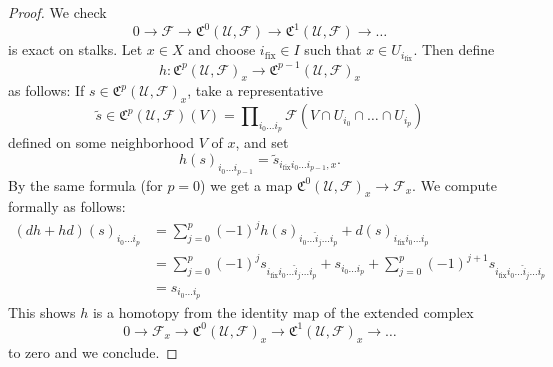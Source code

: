 \begin{proof}
We check
$$
0 \to \mathcal{F} \to \mathfrak{C}^0(\mathcal{U}, \mathcal{F}) \to
\mathfrak{C}^1(\mathcal{U}, \mathcal{F}) \to  \ldots
$$
is exact on stalks. Let $x \in X$ and choose $i_{\text{fix}} \in I$
such that $x \in U_{i_{\text{fix}}}$. Then define 
$$
h : \mathfrak{C}^p(\mathcal{U}, \mathcal{F})_x
\to \mathfrak{C}^{p - 1}(\mathcal{U}, \mathcal{F})_x
$$
as follows: If $s \in \mathfrak{C}^p(\mathcal{U}, \mathcal{F})_x$, take
a representative
$$
\widetilde{s} \in
\mathfrak{C}^p(\mathcal{U}, \mathcal{F})(V) =
\prod\nolimits_{i_0 \ldots i_p}
\mathcal{F}(V \cap U_{i_0} \cap \ldots \cap U_{i_p})
$$
defined on some neighborhood $V$ of $x$, and set
$$
h(s)_{i_0 \ldots i_{p - 1}} =
\widetilde{s}_{i_{\text{fix}} i_0 \ldots i_{p - 1}, x}.
$$
By the same formula (for $p = 0$) we get a map
$\mathfrak{C}^{0}(\mathcal{U},\mathcal{F})_x \to \mathcal{F}_x$.
We compute formally as follows:
\begin{align*}
(dh + hd)(s)_{i_0 \ldots i_p}
& =
\sum\nolimits_{j = 0}^p
(-1)^j
h(s)_{i_0 \ldots \hat i_j \ldots i_p}
+
d(s)_{i_{\text{fix}} i_0 \ldots i_p}\\
& =
\sum\nolimits_{j = 0}^p
(-1)^j
s_{i_{\text{fix}} i_0 \ldots \hat i_j \ldots i_p}
+
s_{i_0 \ldots i_p}
+
\sum\nolimits_{j = 0}^p
(-1)^{j + 1}
s_{i_{\text{fix}} i_0 \ldots \hat i_j \ldots i_p} \\
& =
s_{i_0 \ldots i_p}
\end{align*}
This shows $h$ is a homotopy from the identity map of
the extended complex
$$
0 \to \mathcal{F}_x \to \mathfrak{C}^0(\mathcal{U}, \mathcal{F})_x
\to \mathfrak{C}^1(\mathcal{U}, \mathcal{F})_x \to \ldots
$$
to zero and we conclude.
\end{proof}

